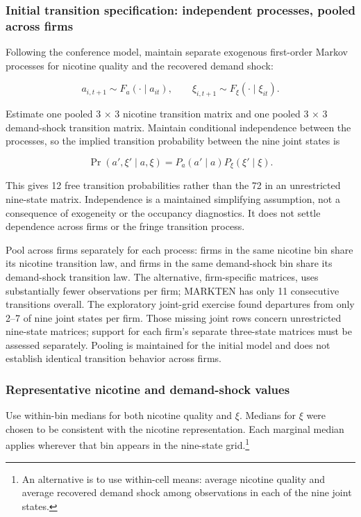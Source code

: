 \documentclass[10pt,]{article}
\begin{document}
\subsubsection{Initial transition specification: independent processes,
pooled across
firms}\label{initial-transition-specification-independent-processes-pooled-across-firms}

Following the conference model, maintain separate exogenous first-order
Markov processes for nicotine quality and the recovered demand shock:

\[
a_{i,t+1}\sim F_a(\cdot\mid a_{it}),\qquad
\xi_{i,t+1}\sim F_\xi(\cdot\mid\xi_{it}).
\]

Estimate one pooled 3 × 3 nicotine transition matrix and one pooled 3 ×
3 demand-shock transition matrix. Maintain conditional independence
between the processes, so the implied transition probability between the
nine joint states is

\[
\Pr(a',\xi'\mid a,\xi)=P_a(a'\mid a)P_\xi(\xi'\mid\xi).
\]

This gives 12 free transition probabilities rather than the 72 in an
unrestricted nine-state matrix. Independence is a maintained simplifying
assumption, not a consequence of exogeneity or the occupancy
diagnostics. It does not settle dependence across firms or the fringe
transition process.

Pool across firms separately for each process: firms in the same
nicotine bin share its nicotine transition law, and firms in the same
demand-shock bin share its demand-shock transition law. The alternative,
firm-specific matrices, uses substantially fewer observations per firm;
MARKTEN has only 11 consecutive transitions overall. The exploratory
joint-grid exercise found departures from only 2--7 of nine joint states
per firm. Those missing joint rows concern unrestricted nine-state
matrices; support for each firm's separate three-state matrices must be
assessed separately. Pooling is maintained for the initial model and
does not establish identical transition behavior across firms.

\subsubsection{Representative nicotine and demand-shock
values}\label{representative-nicotine-and-demand-shock-values}

Use within-bin medians for both nicotine quality and \(\xi\). Medians
for \(\xi\) were chosen to be consistent with the nicotine
representation. Each marginal median applies wherever that bin appears
in the nine-state grid.\footnote{An alternative is to use within-cell
  means: average nicotine quality and average recovered demand shock
  among observations in each of the nine joint states.}
\end{document}
